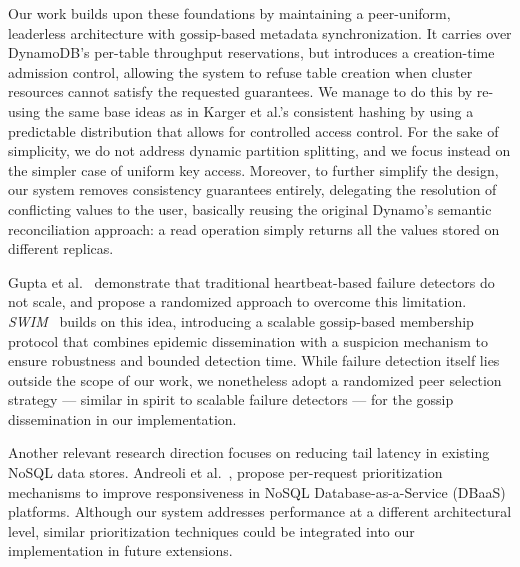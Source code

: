 Our work builds upon these foundations by maintaining a peer-uniform, leaderless architecture with gossip-based metadata synchronization.
It carries over DynamoDB's per-table throughput reservations, but introduces a creation-time admission control,
allowing the system to refuse table creation when cluster resources cannot satisfy the requested guarantees.
We manage to do this by re-using the same base ideas as in Karger et al.'s consistent hashing by using
a predictable distribution that allows for controlled access control.
For the sake of simplicity, we do not address dynamic partition splitting, and we focus instead on the simpler case of uniform key access.
Moreover, to further simplify the design,
our system removes consistency guarantees entirely, delegating the resolution of conflicting values to the user, basically reusing the original Dynamo's semantic reconciliation approach: a read operation simply returns all the values stored on different replicas.

Gupta et al.~\cite{FailureDetection} demonstrate that traditional heartbeat-based failure detectors do not scale,
and propose a randomized approach to overcome this limitation.
\textit{SWIM}~\cite{SWIM} builds on this idea, introducing a scalable gossip-based membership protocol
that combines epidemic dissemination with a suspicion mechanism to ensure robustness and bounded detection time.
While failure detection itself lies outside the scope of our work, we nonetheless adopt a randomized peer selection
strategy --- similar in spirit to scalable failure detectors --- for the gossip dissemination in our implementation.


Another relevant research direction focuses on reducing tail latency in existing NoSQL data stores.
Andreoli et al.~\cite{RTMongo, PriorityMongoDB}, propose per-request prioritization mechanisms
to improve responsiveness in NoSQL Database-as-a-Service (DBaaS) platforms.
Although our system addresses performance at a different architectural level,
similar prioritization techniques could be integrated into our implementation
in future extensions.

